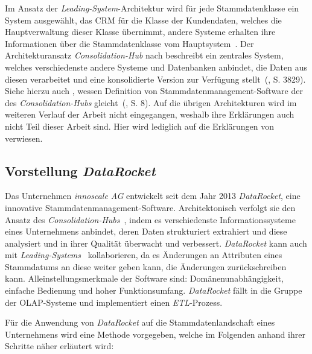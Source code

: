 \documentclass[
  language=german, %
  type=bachelor%
]{isthesis}
\begin{document}
\begin{content}
  Im Ansatz der \textit{Leading-System}-Architektur wird für jede
  Stammdatenklasse ein System ausgewählt, \zB{} das \acrshort{CRM} für die
  Klasse der Kundendaten, welches die Hauptverwaltung dieser Klasse übernimmt,
  andere Systeme erhalten ihre Informationen über die Stammdatenklasse vom
  Hauptsystem~\cite[][S. 3829]{baghi2014toward}. Der Architekturansatz
  \textit{Consolidation-Hub} nach \textsc{\citeauthor{baghi2014toward}}
  beschreibt ein zentrales System, welches verschiedenste andere Systeme und
  Datenbanken anbindet, die Daten aus diesen verarbeitet und eine konsolidierte
  Version zur Verfügung stellt~(\citeyear{baghi2014toward}, S. 3829). Siehe
  hierzu auch \textsc{\citeauthor{loshin2010master}}, wessen Definition von
  Stammdatenmanagement-Software der des \textit{Consolidation-Hubs}
  gleicht~(\citeyear{loshin2010master}, S. 8). Auf die übrigen Architekturen
  wird im weiteren Verlauf der Arbeit nicht eingegangen, weshalb ihre
  Erklärungen auch nicht Teil dieser Arbeit sind. Hier wird lediglich auf die
  Erklärungen von~\textsc{\citeauthor{baghi2014toward}}
  \citeyearpar{baghi2014toward} verwiesen.


  \subsection{Vorstellung \textit{DataRocket}}\label{sec:Vorstellung-DataRocket}

	Das Unternehmen \textit{innoscale AG} entwickelt seit dem Jahr 2013
	\textit{DataRocket}, eine innovative Stammdatenmanagement-Software.
	Architektonisch verfolgt sie den Ansatz des
  \textit{Consolidation-Hubs}~\cite[][]{baghi2014toward}, indem es
	verschiedenste Informationssysteme eines Unternehmens anbindet, deren Daten
	strukturiert extrahiert und diese analysiert und in ihrer Qualität überwacht
	und verbessert. \textit{DataRocket} kann auch mit
  \textit{Leading-Systems}~\cite[][]{baghi2014toward}
	kollaborieren, da es Änderungen an Attributen eines Stammdatums an diese
	weiter geben kann, \bzw{} die Änderungen zurückschreiben kann.
	Alleinstellungsmerkmale der Software sind: Domänenunabhängigkeit, einfache
	Bedienung und hoher Funktionsumfang. \textit{DataRocket} fällt in die Gruppe der
	\acrshort{OLAP}-Systeme und implementiert einen
	\textit{\acrlong{ETL}}-Prozess.

	Für die Anwendung von \textit{DataRocket} auf die Stammdatenlandschaft eines
	Unternehmens wird eine Methode vorgegeben, welche im Folgenden anhand ihrer
	Schritte näher erläutert wird:


\end{content}
\end{document}

